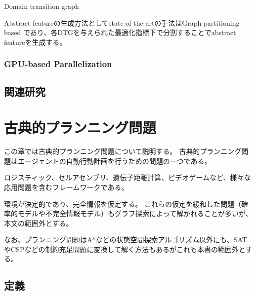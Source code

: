 \documentclass{report}
\begin{document}
Domain transition graph

Abstract featureの生成方法としてstate-of-the-artの手法はGraph partitioning-based \cite{jinnai2017work}であり、各DTGを与えられた最適化指標下で分割することでabstract featureを生成する。

\subsection{GPU-based Parallelization}



\section{関連研究}

\chapter{古典的プランニング問題}
\label{ch:classical-planning}
この章では古典的プランニング問題について説明する。
古典的プランニング問題はエージェントの自動行動計画を行うための問題の一つである\cite{}。

ロジスティック\cite{helmert2010scanalyzer,sousa2013toward}、セルアセンブリ\cite{asai2014fully}、遺伝子距離計算\cite{erdem2005genome}、ビデオゲーム\cite{Lipovetzky2015a}など、様々な応用問題を含むフレームワークである。

環境が決定的であり、完全情報を仮定する。
これらの仮定を緩和した問題（確率的モデルや不完全情報モデル）もグラフ探索によって解かれることが多いが、本文の範囲外とする\cite{}。

なお、プランニング問題はA*などの状態空間探索アルゴリズム以外にも、SATやCSPなどの制約充足問題に変換して解く方法もあるがこれも本書の範囲外とする\cite{}。

\section{定義}
\end{document}
